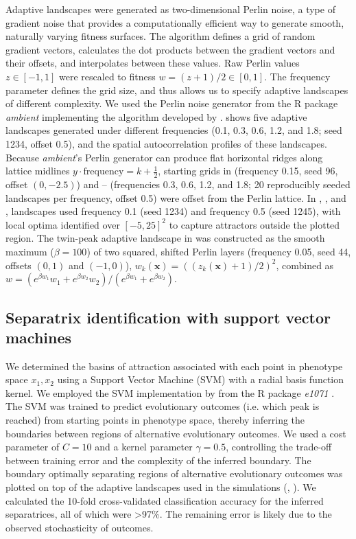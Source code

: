 Adaptive landscapes were generated as two-dimensional Perlin noise, a type of gradient noise that provides a computationally efficient way to generate smooth, naturally varying fitness surfaces.
The algorithm defines a grid of random gradient vectors, calculates the dot products between the gradient vectors and their offsets, and interpolates between these values.
Raw Perlin values $z \in [-1, 1]$ were rescaled to fitness $w = (z + 1)/2 \in [0, 1]$.
The frequency parameter defines the grid size, and thus allows us to specify adaptive landscapes of different complexity.
We used the Perlin noise generator from the R package \textit{ambient} \parencite{ambient2025} implementing the algorithm developed by \cite{perlin1985image}.
 shows five adaptive landscapes generated under different frequencies (0.1, 0.3, 0.6, 1.2, and 1.8; seed 1234, offset 0.5), and the spatial autocorrelation profiles of these landscapes.
Because \textit{ambient}'s Perlin generator can produce flat horizontal ridges along lattice midlines $y \cdot \text{frequency} = k + \frac{1}{2}$, starting grids in  (frequency 0.15, seed 96, offset $(0, -2.5)$) and -- (frequencies 0.3, 0.6, 1.2, and 1.8; 20 reproducibly seeded landscapes per frequency, offset 0.5) were offset from the Perlin lattice.
In , , and , landscapes used frequency 0.1 (seed 1234) and frequency 0.5 (seed 1245), with local optima identified over $[-5, 25]^2$ to capture attractors outside the plotted region.
The twin-peak adaptive landscape in  was constructed as the smooth maximum ($\beta = 100$) of two squared, shifted Perlin layers (frequency 0.05, seed 44, offsets $(0, 1)$ and $(-1, 0)$), $w_k(\mathbf{x}) = ((z_k(\mathbf{x}) + 1)/2)^2$, combined as $w = (e^{\beta w_1} w_1 + e^{\beta w_2} w_2)/(e^{\beta w_1} + e^{\beta w_2})$.





\subsection{Separatrix identification with support vector machines}

We determined the basins of attraction associated with each point in phenotype space $x_1, x_2$ using a Support Vector Machine (SVM) with a radial basis function kernel.
We employed the SVM implementation by \cite{chang2011libsvm} from the R package \textit{e1071} \parencite{e1071_manual}.
The SVM was trained to predict evolutionary outcomes (i.e. which peak is reached) from starting points in phenotype space, thereby inferring the boundaries between regions of alternative evolutionary outcomes.
We used a cost parameter of $C=10$ and a kernel parameter $\gamma=0.5$, controlling the trade-off between training error and the complexity of the inferred boundary.
The boundary optimally separating regions of alternative evolutionary outcomes was plotted on top of the adaptive landscapes used in the simulations (, ).
We calculated the 10-fold cross-validated classification accuracy for the inferred separatrices, all of which were >97\%.
The remaining error is likely due to the observed stochasticity of outcomes.
